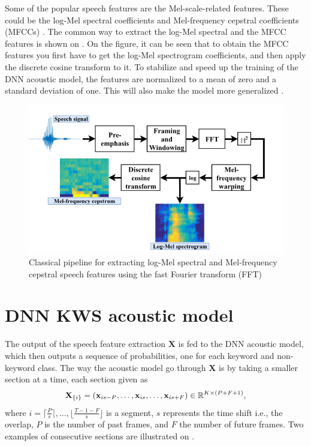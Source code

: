 Some of the popular speech features are the Mel-scale-related features. These could be the log-Mel spectral coefficients and Mel-frequency cepstral coefficients (MFCCs) \cite{lopez2021deep}. The common way to extract the log-Mel spectral and the MFCC features is shown on . On the figure, it can be seen that to obtain the MFCC features you first have to get the log-Mel spectrogram coefficients, and then apply the discrete cosine transform to it. To stabilize and speed up the training of the DNN acoustic model, the features are normalized to a mean of zero and a standard deviation of one. This will also make the model more generalized \cite{lopez2021deep}. 

\begin{figure}[ht]
    \centering
    \includegraphics[width=\textwidth]{incl/img/kws/MFCC.png}
    \caption{ Classical pipeline for extracting log-Mel spectral and
    Mel-frequency cepstral speech features using the fast Fourier transform
    (FFT) \cite{lopez2021deep}}
    \label{fig:MFCC}
\end{figure}


\section{DNN KWS acoustic model}
The output of the speech feature extraction \(\textbf{X}\) is fed to the DNN acoustic model, which then outputs a sequence of probabilities, one for each keyword and non-keyword class. The way the acoustic model go through \(\textbf{X}\) is by taking a smaller section at a time, each section given as
\begin{align}
    \textbf{X}_{\{i\}} = \qty(\textbf{x}_{is-P}, \dots, \textbf{x}_{is}, \dots, \textbf{x}_{is+F}) \in \mathbb{R}^{K\times (P+F+1)},
\end{align} 
where \(i = \lceil \frac{P}{s} \rceil, \dots, \lfloor \frac{T-1-F}{s} \rfloor\) is a segment, \(s\) represents the time shift i.e., the overlap, \(P\) is the number of past frames, and \(F\) the number of future frames. Two examples of consecutive sections are illustrated on . 


